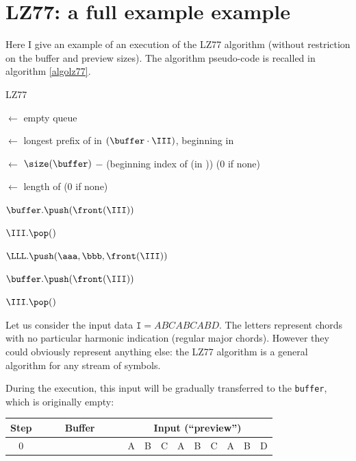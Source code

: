 \documentclass[a4paper,10pt]{article}
\newcommand{\guill}[1]{``#1''}
\begin{document}
\newpage

\section{LZ77: a full example example}

Here I give an example of an execution of the LZ77 algorithm (without restriction on the buffer and preview sizes). The algorithm pseudo-code is recalled in algorithm \ref{algolz77}.

\begin{algorithm}
\caption{LZ77 \label{algolz77}}
       
   


\Debut
{
	\buffer $\leftarrow$ empty queue 

	{
		\pref $\leftarrow$ longest prefix of \III in $(\buffer\cdot\III)$, beginning in \buffer

		\aaa $\leftarrow$ $\size(\buffer)$ $-$ (beginning index of \pref (in \buffer)) ($0$ if none)

		\bbb $\leftarrow$ length of \pref ($0$ if none)

		{
			$\buffer.\push(\front(\III))$

			$\III.\pop()$
		}
		$\LLL.\push(\aaa,\bbb,\front(\III))$

		$\buffer.\push(\front(\III))$

		$\III.\pop()$
	}
	\Retour \LLL
}
\end{algorithm}

Let us consider the input data $\texttt{I}=ABCABCABD$. The letters represent chords with no particular harmonic indication (regular major chords). However they could obviously represent anything else: the LZ77 algorithm is a general algorithm for any stream of symbols.

During the execution, this input will be gradually transferred to the \texttt{buffer}, which is originally empty: \\

\begin{tabular}{|c|c|c|c|c|c|c|c|c|c|c|c|c|c|c|c|c|c|c|}
\hline
\textbf{Step}&\multicolumn{9}{|c|}{\textbf{Buffer}} & \multicolumn{9}{|c|}{\textbf{Input} (\guill{preview})} \\
\hline
0&&&&&&&&&&A&B&C&A&B&C&A&B&D\\
\hline
\end{tabular} \\
\end{document}
